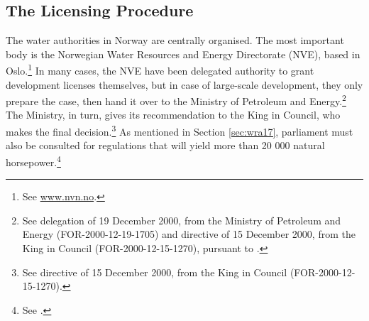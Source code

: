 %
%
%

\subsection{The Licensing Procedure}\label{sec:step}

The water authorities in Norway are centrally organised. The most important body is the Norwegian Water Resources and Energy Directorate (NVE), based in Oslo.\footnote{See \url{www.nvn.no}.} In many cases, the NVE have been delegated authority to grant development licenses themselves, but in case of large-scale development, they only prepare the case, then hand it over to the Ministry of Petroleum and Energy.\footnote{See delegation of 19 December 2000, from the Ministry of Petroleum and Energy (FOR-2000-12-19-1705) and directive of 15 December 2000, from the King in Council (FOR-2000-12-15-1270), pursuant to \cite[64]{wra00}.} The Ministry, in turn, gives its recommendation to the King in Council, who makes the final decision.\footnote{See directive of 15 December 2000, from the King in Council (FOR-2000-12-15-1270).} As mentioned in Section \ref{sec:wra17}, parliament must also be consulted for regulations that will yield more than 20 000 natural horsepower.\footnote{See \cite[2]{wra17}.}

